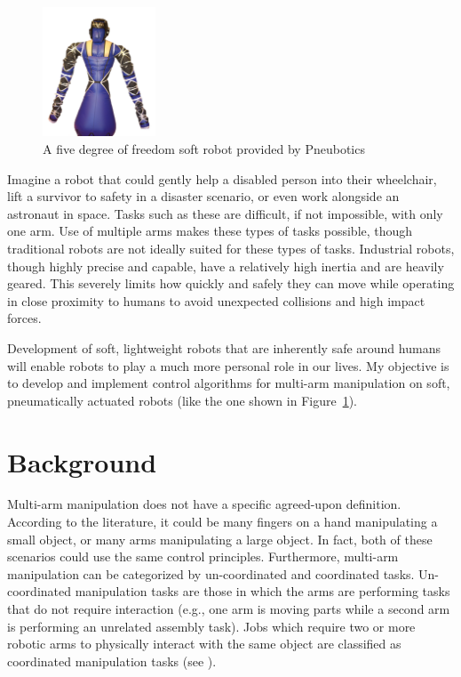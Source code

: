 \documentclass[12pt, letterpaper]{article}
\begin{document}
\begin{figure}
  \begin{center}
    \includegraphics[trim = 0.5cm 0cm 0.5cm 1cm,clip,width=0.3\textwidth]{king_louie.png}
  \end{center}
  \caption{A five degree of freedom soft robot provided by Pneubotics}
  \label{fig:kinglouie}
\end{figure}

Imagine a robot that could gently help a disabled person into their wheelchair, lift a survivor to safety in a disaster scenario, or even work alongside an astronaut in space. Tasks such as these are difficult, if not impossible, with only one arm. Use of multiple arms makes these types of tasks possible, though traditional robots are not ideally suited for these types of tasks. Industrial robots, though highly precise and capable, have a relatively high inertia and are heavily geared. This severely limits how quickly and safely they can move while operating in close proximity to humans to avoid unexpected collisions and high impact forces.

Development of soft, lightweight robots that are inherently safe around humans will enable robots to play a much more personal role in our lives. My objective is to develop and implement control algorithms for multi-arm manipulation on soft, pneumatically actuated robots (like the one shown in Figure~\ref{fig:kinglouie}). 

\section{Background}
Multi-arm manipulation does not have a specific agreed-upon definition. According to the literature, it could be many fingers on a hand manipulating a small object, or many arms manipulating a large object. In fact, both of these scenarios could use the same control principles. Furthermore, multi-arm manipulation can be categorized by un-coordinated and coordinated tasks. Un-coordinated manipulation tasks are those in which the arms are performing tasks that do not require interaction (e.g., one arm is moving parts while a second arm is performing an unrelated assembly task). Jobs which require two or more robotic arms to physically interact with the same object are classified as coordinated manipulation tasks (see \cite{Smith2012}).  
\end{document}

